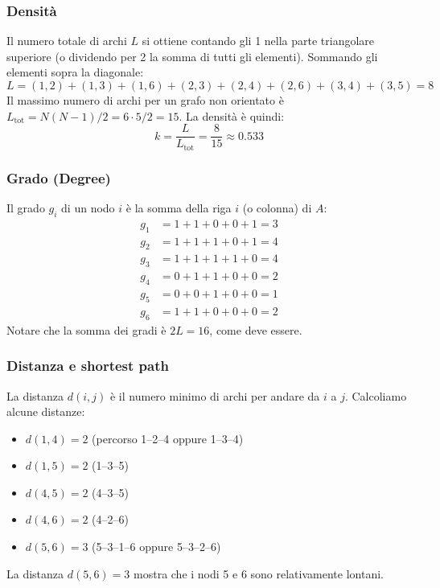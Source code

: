 \subsubsection{Densità}
Il numero totale di archi $L$ si ottiene contando gli 1 nella parte triangolare superiore (o dividendo per 2 la somma di tutti gli elementi). Sommando gli elementi sopra la diagonale:
\[
L = (1,2) + (1,3) + (1,6) + (2,3) + (2,4) + (2,6) + (3,4) + (3,5) = 8
\]
Il massimo numero di archi per un grafo non orientato è $L_{\text{tot}} = N(N-1)/2 = 6\cdot5/2 = 15$.
La densità è quindi:
\[
k = \frac{L}{L_{\text{tot}}} = \frac{8}{15} \approx 0.533
\]

\subsubsection{Grado (Degree)}
Il grado $g_i$ di un nodo $i$ è la somma della riga $i$ (o colonna) di $A$:
\begin{align*}
g_1 &= 1+1+0+0+1 = 3 \\
g_2 &= 1+1+1+0+1 = 4 \\
g_3 &= 1+1+1+1+0 = 4 \\
g_4 &= 0+1+1+0+0 = 2 \\
g_5 &= 0+0+1+0+0 = 1 \\
g_6 &= 1+1+0+0+0 = 2
\end{align*}
Notare che la somma dei gradi è $2L = 16$, come deve essere.

\subsubsection{Distanza e shortest path}
La distanza $d(i,j)$ è il numero minimo di archi per andare da $i$ a $j$. Calcoliamo alcune distanze:
\begin{itemize}
    \item $d(1,4) = 2$ (percorso 1–2–4 oppure 1–3–4)
    \item $d(1,5) = 2$ (1–3–5)
    \item $d(4,5) = 2$ (4–3–5)
    \item $d(4,6) = 2$ (4–2–6)
    \item $d(5,6) = 3$ (5–3–1–6 oppure 5–3–2–6)
\end{itemize}
La distanza $d(5,6)=3$ mostra che i nodi 5 e 6 sono relativamente lontani.

